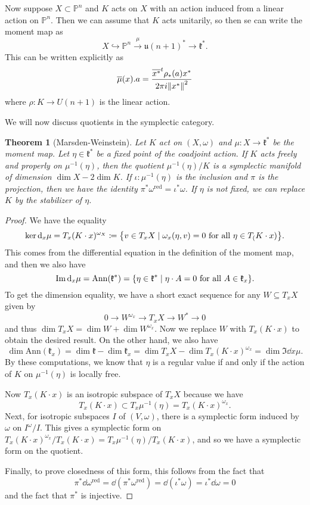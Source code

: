 \documentclass[leqno, openany]{memoir}
\newtheorem{thm}{Theorem}[section]
\theoremstyle{definition}
\theoremstyle{remark}
\theoremstyle{plain}
\theoremstyle{definition}
\theoremstyle{remark}
\renewcommand{\P}{\mathbb{P}}
\newcommand{\mf}[1]{\mathfrak{#1}}
\newcommand{\mr}[1]{\mathrm{#1}}
\newcommand{\ol}[1]{\overline{#1}}
\begin{document}
Now suppose $X \subset \P^n$ and $K$ acts on $X$ with an action induced from a linear action on $\P^n$. Then we can assume that $K$ acts unitarily, so then se can write the moment map as
\[ X \hookrightarrow \P^n \xrightarrow{\mu} \mf{u}(n+1)^* \to \mf{k}^*. \]
This can be written explicitly as
\[ \ol{\mu}(x).a = \frac{\ol{x^*}^t \rho_*(a)x^*}{2\pi i \norm{x^*}^2} \]
where $\rho \colon K \to U(n+1)$ is the linear action.


We will now discuss quotients in the symplectic category.
\begin{thm}[Marsden-Weinstein]
    Let $K$ act on $(X, \omega)$ and $\mu \colon X \to \mf{k}^*$ be the moment map. Let $\eta \in \mf{k}^*$ be a fixed point of the coadjoint action. If $K$ acts freely and properly on $\mu^{-1}(\eta)$, then the quotient $\mu^{-1}(\eta)/K$ is a symplectic manifold of dimension $\dim X - 2 \dim K$. If $\iota \colon \mu^{-1}(\eta)$ is the inclusion and $\pi$ is the projection, then we have the identity $\pi^*\omega^{\mr{red}}  = \iota^*\omega$. If $\eta$ is not fixed, we can replace $K$ by the stabilizer of $\eta$.
\end{thm}

\begin{proof}
    We have the equality
    \[ \ker \dd_x{\mu} = T_x(K \cdot x)^{\omega_X} \coloneqq \qty{v \in T_x X \mid \omega_x(\eta, v) = 0 \text{ for all } \eta \in T_(K \cdot x)}. \]
    This comes from the differential equation in the definition of the moment map, and then we also have
    \[ \Im \dd_x {\mu} = \mr{Ann}(\mf{k}^*) = \qty{\eta \in \mf{k}^* \mid \eta \cdot A = 0 \text{ for all }A \in \mf{k}_x}. \]
    To get the dimension equality, we have a short exact sequence for any $W \subseteq T_x X$ given by
    \[ 0 \to W^{\omega_x} \to T_x X \to W^* \to 0 \]
    and thus $\dim T_x X = \dim W + \dim W^{\omega_x}$. Now we replace $W$ with $T_x(K\cdot x)$ to obtain the desired result. On the other hand, we also have
    \[ \dim \mr{Ann}(\mf{k}_x) = \dim \mf{k} - \dim \mf{k}_x = \dim T_x X - \dim T_x(K \cdot x)^{\omega_x} = \dim \Im \dd{x} \mu. \]
    By these computations, we know that $\eta$ is a regular value if and only if the action of $K$ on $\mu^{-1}(\eta)$ is locally free.

    Now $T_x(K \cdot x)$ is an isotropic subspace of $T_x X$ because we have
    \[ T_x(K \cdot x) \subset T_x \mu^{-1}(\eta) = T_x(K \cdot x)^{\omega_x}. \]
    Next, for isotropic subspaces $I$ of $(V, \omega)$, there is a symplectic form induced by $\omega$ on $I^{\omega} / I$. This gives a symplectic form on $T_x(K \cdot x)^{\omega_x} / T_x(K \cdot x) = T_x \mu^{-1}(\eta) / T_x(K \cdot x)$, and so we have a symplectic form on the quotient.

    Finally, to prove closedness of this form, this follows from the fact that 
    \[ \pi^* \dd{\omega^{\mr{red}}} = \dd{(\pi^* \omega^{\mr{red}})} = \dd{(\iota^* \omega)} = \iota^* \dd{\omega} = 0 \]
    and the fact that $\pi^*$ is injective.
\end{proof}
\end{document}
